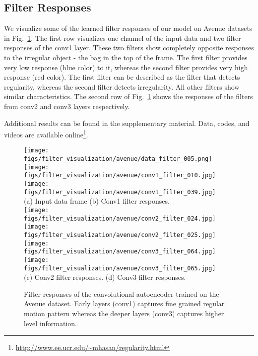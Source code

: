 \documentclass[10pt,twocolumn,letterpaper]{article}
\begin{document}
\subsection{Filter Responses}
We visualize some of the learned filter responses of our model on Avenue datasets in Fig.~\ref{fig:filter_vis}.
The first row visualizes one channel of the input data and two filter responses of the conv1 layer. 
These two filters show completely opposite responses to the irregular object - the bag in the top of the frame. 
The first filter provides very low response (blue color) to it, whereas the second filter provides very high response (red color).
The first filter can be described as the filter that detects regularity, whereas the second filter detects irregularity.
All other filters show similar characteristics.
The second row of Fig.~\ref{fig:filter_vis} shows the responses of the filters from conv2 and conv3 layers respectively.

Additional results can be found in the supplementary material. Data, codes, and videos are available online\footnote{\url{http://www.ee.ucr.edu/~mhasan/regularity.html}}.

\begin{figure}[h]
	\centering
		\texttt{[image: figs/filter\_visualization/avenue/data\_filter\_005.png]}
		\texttt{[image: figs/filter\_visualization/avenue/conv1\_filter\_010.jpg]}
		\texttt{[image: figs/filter\_visualization/avenue/conv1\_filter\_039.jpg]}\\
		{\footnotesize \hspace{-3.5em}(a) Input data frame \hspace{5.5em} (b) Conv1 filter responses.} \\ 
		\vspace{2mm}
\texttt{[image: figs/filter\_visualization/avenue/conv2\_filter\_024.jpg]}
		\texttt{[image: figs/filter\_visualization/avenue/conv2\_filter\_025.jpg]}\hspace{.5em}
		\texttt{[image: figs/filter\_visualization/avenue/conv3\_filter\_064.jpg]}
		\texttt{[image: figs/filter\_visualization/avenue/conv3\_filter\_065.jpg]}\\
		{\footnotesize (c) Conv2 filter responses. \hspace{4em} (d) Conv3 filter responses.} \\
\vspace{1mm}
	\caption{Filter responses of the convolutional autoencoder trained on the Avenue dataset. Early layers (conv1) captures fine grained regular motion pattern whereas the deeper layers (conv3) captures higher level information.}
	\vspace{-1em}
	\label{fig:filter_vis}
\end{figure}
\end{document}
